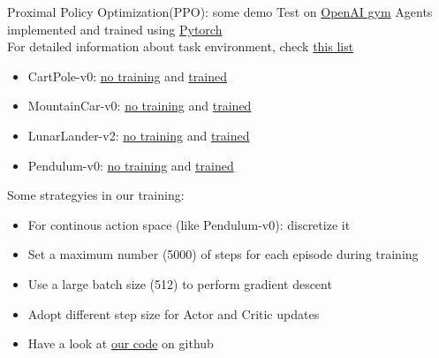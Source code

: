 \begin{frame}{Proximal Policy Optimization(PPO): some demo}
    \vspace{0.15cm}
    Test on \href{https://gym.openai.com/}{OpenAI gym} Agents implemented and trained using \href{https://en.wikipedia.org/wiki/PyTorch}{Pytorch}\\\vspace{0.15cm}
    For detailed information about task environment, check \href{https://github.com/openai/gym/wiki/Table-of-environments}{this list}\\\vspace{0.15cm}
    \begin{itemize}
        \item CartPole-v0: \href{https://www.youtube.com/watch?v=1bvTOM7Az3s}{no training} and \href{https://www.youtube.com/watch?v=l1gOoNFSq8E}{trained}
        \item MountainCar-v0: \href{https://www.youtube.com/watch?v=SAGHdqGvbzA}{no training} and \href{https://www.youtube.com/watch?v=6wYzj74x_l4}{trained}
        \item LunarLander-v2: \href{https://www.youtube.com/watch?v=ZFmx0l6Pe60}{no training} and \href{https://www.youtube.com/watch?v=BysTYEG4fDE}{trained}
        \item Pendulum-v0: \href{https://www.youtube.com/watch?v=bxojAfY5PPw&t=5s}{no training} and \href{https://www.youtube.com/watch?v=yasKyY3hE88}{trained}
    \end{itemize}
    Some strategyies in our training:\\\vspace{0.15cm}
     \begin{itemize}
        \item For continous action space (like Pendulum-v0): discretize it
        \item Set a maximum number (5000) of steps for each episode during training
        \item Use a large batch size (512) to perform gradient descent
        \item Adopt different step size for Actor and Critic updates
        \item Have a look at \href{https://github.com/JamesTuna/RL_collects/blob/master/PPO/PPO.py}{our code} on github
    \end{itemize}
\end{frame}


